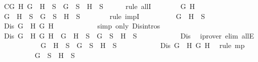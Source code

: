 \begin{isabellebody}
\ C{}{\isacharcolon}{\isachardoublequoteopen}{\isasymforall}G\ H{\isachardot}\ G\ \isactrlbold {\isasymor}\ H\ {\isasymin}\ S\ {\isasymlongrightarrow}\ G\ {\isasymin}\ S\ {\isasymor}\ H\ {\isasymin}\ S{\isachardoublequoteclose}\isanewline
\ \ \ \ \isamarkupfalse%
\ {\isacharparenleft}rule\ allI{\isacharparenright}{\isacharplus}\isanewline
\ \ \ \ \ \ \isamarkupfalse%
\ G\ H\isanewline
\ \ \ \ \ \ \isamarkupfalse%
\ {\isachardoublequoteopen}G\ \isactrlbold {\isasymor}\ H\ {\isasymin}\ S\ {\isasymlongrightarrow}\ G\ {\isasymin}\ S\ {\isasymor}\ H\ {\isasymin}\ S{\isachardoublequoteclose}\isanewline
\ \ \ \ \ \ \isamarkupfalse%
\ {\isacharparenleft}rule\ impI{\isacharparenright}\isanewline
\ \ \ \ \ \ \ \ \isamarkupfalse%
\ {\isachardoublequoteopen}G\ \isactrlbold {\isasymor}\ H\ {\isasymin}\ S{\isachardoublequoteclose}\isanewline
\ \ \ \ \ \ \ \ \isamarkupfalse%
\ {\isachardoublequoteopen}Dis\ {\isacharparenleft}G\ \isactrlbold {\isasymor}\ H{\isacharparenright}\ G\ H{\isachardoublequoteclose}\isanewline
\ \ \ \ \ \ \ \ \ \ \isamarkupfalse%
\ {\isacharparenleft}simp\ only{\isacharcolon}\ Dis{\isachardot}intros{\isacharparenleft}{}{\isacharparenright}{\isacharparenright}\isanewline
\ \ \ \ \ \ \ \ \isamarkupfalse%
\ {\isachardoublequoteopen}Dis\ {\isacharparenleft}G\ \isactrlbold {\isasymor}\ H{\isacharparenright}\ G\ H\ {\isasymlongrightarrow}\ G\ \isactrlbold {\isasymor}\ H\ {\isasymin}\ S\ {\isasymlongrightarrow}\ G\ {\isasymin}\ S\ {\isasymor}\ H\ {\isasymin}\ S{\isachardoublequoteclose}\isanewline
\ \ \ \ \ \ \ \ \ \ \isamarkupfalse%
\ Dis\ \isamarkupfalse%
\ {\isacharparenleft}iprover\ elim{\isacharcolon}\ allE{\isacharparenright}\isanewline
\ \ \ \ \ \ \ \ \isamarkupfalse%
\ \isamarkupfalse%
\ {\isachardoublequoteopen}G\ \isactrlbold {\isasymor}\ H\ {\isasymin}\ S\ {\isasymlongrightarrow}\ G\ {\isasymin}\ S\ {\isasymor}\ H\ {\isasymin}\ S{\isachardoublequoteclose}\isanewline
\ \ \ \ \ \ \ \ \ \ \isamarkupfalse%
\ {\isacartoucheopen}Dis\ {\isacharparenleft}G\ \isactrlbold {\isasymor}\ H{\isacharparenright}\ G\ H{\isacartoucheclose}\ \isamarkupfalse%
\ {\isacharparenleft}rule\ mp{\isacharparenright}\isanewline
\ \ \ \ \ \ \ \ \isamarkupfalse%
\ {\isachardoublequoteopen}G\ {\isasymin}\ S\ {\isasymor}\ H\ {\isasymin}\ S{\isachardoublequoteclose}\isanewline
\ \ \ \ \ \ \ \ \ \ \isamarkupfalse%

\end{isabellebody}
